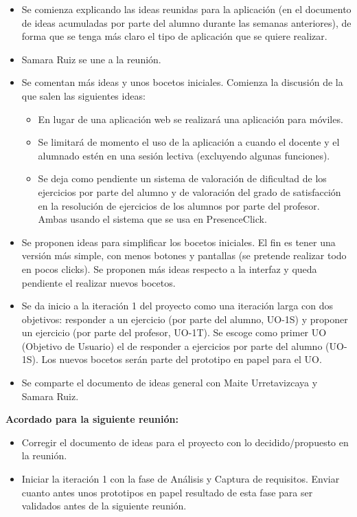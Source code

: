 \begin{itemize}
\item Se comienza explicando las ideas reunidas para la aplicación (en el documento de ideas acumuladas por parte del alumno durante las semanas anteriores), de forma que se tenga más claro el tipo de aplicación que se quiere realizar.

\item Samara Ruiz se une a la reunión.

\item Se comentan más ideas y unos bocetos iniciales. Comienza la discusión de la que salen las siguientes ideas:
\begin{itemize}
	\item En lugar de una aplicación web se realizará una aplicación para móviles.
	\item Se limitará de momento el uso de la aplicación a cuando el docente y el alumnado estén en una sesión lectiva 			(excluyendo algunas funciones).
	\item Se deja como pendiente un sistema de valoración de dificultad de los ejercicios por parte del alumno y de 			valoración del grado de satisfacción en la resolución de ejercicios de los alumnos por parte del profesor. Ambas 			usando el sistema que se usa en PresenceClick.
\end{itemize}

\item Se proponen ideas para simplificar los bocetos iniciales. El fin es tener una versión más simple, con menos botones y pantallas (se pretende realizar todo en pocos clicks). Se proponen más ideas respecto a la interfaz y queda pendiente el realizar nuevos bocetos.

\item Se da inicio a la iteración 1 del proyecto como una iteración larga con dos objetivos: responder a un ejercicio (por parte del alumno, UO-1S) y proponer un ejercicio (por parte del profesor, UO-1T). Se escoge como primer UO (Objetivo de Usuario) el de responder a ejercicios por parte del alumno (UO-1S). Los nuevos bocetos serán parte del prototipo en papel para el UO.

\item Se comparte el documento de ideas general con Maite Urretavizcaya y Samara Ruiz.
\end{itemize}

\textbf{Acordado para la siguiente reunión:}

\begin{itemize}
\item Corregir el documento de ideas para el proyecto con lo decidido/propuesto en la reunión.

\item Iniciar la iteración 1 con la fase de Análisis y Captura de requisitos. Enviar cuanto antes unos prototipos en papel resultado de esta fase para ser validados antes de la siguiente reunión.
\end{itemize}
